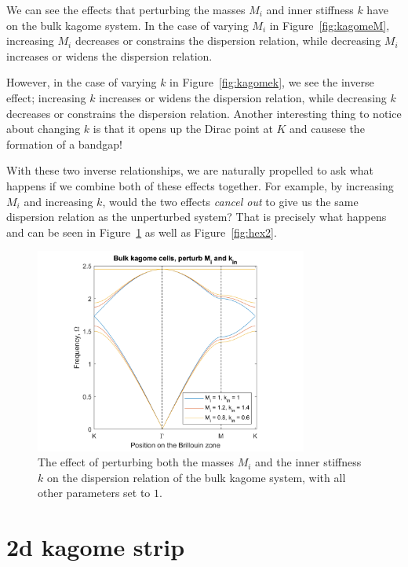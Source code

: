 We can see the effects that perturbing the masses $M_i$ and inner stiffness $k$
have on the bulk kagome system. In the case of varying $M_i$ in
Figure~\ref{fig:kagomeM}, increasing $M_i$ decreases or constrains the
dispersion relation, while decreasing $M_i$ increases or widens the dispersion
relation. 

However, in the case of varying $k$ in Figure~\ref{fig:kagomek}, we see the inverse
effect; increasing $k$ increases or widens the dispersion relation, while
decreasing $k$ decreases or constrains the dispersion relation. Another
interesting thing to notice about changing $k$ is that it opens up the Dirac
point at $K$ and causese the formation of a bandgap!

With these two inverse relationships, we are naturally propelled to ask what
happens if we combine both of these effects together. For example, by
increasing $M_i$ and increasing $k$, would the two effects \textit{cancel out}
to give us the same dispersion relation as the unperturbed system? That is
precisely what happens and can be seen in Figure~\ref{fig:kagome2} as well as
Figure~\ref{fig:hex2}.

\begin{figure}[!h]
\centering
\includegraphics[width=0.8\textwidth]{imgs/kagomeperturb2.png}
\caption{\label{fig:kagome2} The effect of perturbing both the masses $M_i$ and
  the inner stiffness $k$ on the dispersion relation of the bulk kagome system,
  with all other parameters set to $1$.}
\end{figure}

\section{2d kagome strip}

